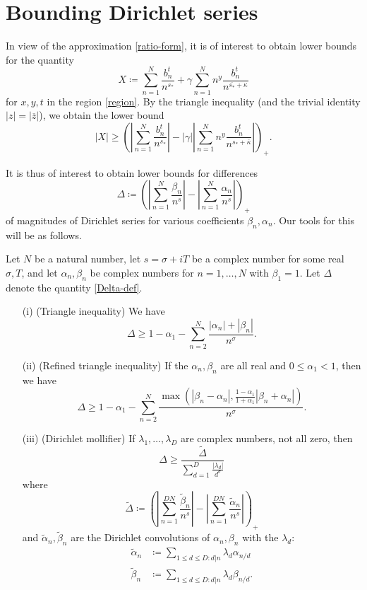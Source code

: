 \section{Bounding Dirichlet series}

In view of the approximation \eqref{ratio-form}, it is of interest to obtain lower bounds for the quantity
\begin{equation}\label{xco}
X \coloneqq \sum_{n=1}^N \frac{b_n^t}{n^{s_*}} + \gamma \sum_{n=1}^N n^y \frac{b_n^t}{n^{\overline{s_*} + \kappa}}
\end{equation}
for $x,y,t$ in the region \eqref{region}.  By the triangle inequality (and the trivial identity $|z| = |\overline{z}|$), we obtain the lower bound
$$ |X| \geq \left( \left| \sum_{n=1}^N \frac{b_n^t}{n^{s_*}}\right| - |\gamma| \left| \sum_{n=1}^N n^y \frac{b_n^t}{n^{s_* + \overline{\kappa}}} \right|\right)_+.$$

It is thus of interest to obtain lower bounds for differences
\begin{equation}\label{Delta-def}
 \Delta \coloneqq \left( \left| \sum_{n=1}^N \frac{\beta_n}{n^s}\right| - \left| \sum_{n=1}^N \frac{\alpha_n}{n^s}\right| \right)_+
\end{equation}
of magnitudes of Dirichlet series for various coefficients $\beta_n, \alpha_n$.  Our tools for this will be as follows.

\begin{lemma}\label{dirb}  Let $N$ be a natural number, let $s = \sigma+iT$ be a complex number for some real $\sigma,T$, and let $\alpha_n,\beta_n$ be complex numbers for $n=1,\dots,N$ with $\beta_1=1$.  Let $\Delta$ denote the quantity \eqref{Delta-def}.
\begin{itemize}
\item[(i)]  (Triangle inequality) We have
$$ \Delta \geq 1 - \alpha_1 - \sum_{n=2}^N \frac{|\alpha_n| + |\beta_n|}{n^\sigma}.$$
\item[(ii)]  (Refined triangle inequality) If the $\alpha_n,\beta_n$ are all real and $0 \leq \alpha_1 <1$, then we have 
$$ \Delta \geq 1 - \alpha_1 - \sum_{n=2}^N \frac{\max( |\beta_n-\alpha_n|, \frac{1-\alpha_1}{1+\alpha_1} |\beta_n+\alpha_n|)}{n^\sigma}.$$
\item[(iii)]  (Dirichlet mollifier)  If $\lambda_1,\dots,\lambda_D$ are complex numbers, not all zero, then
$$ \Delta \geq \frac{\tilde \Delta}{\sum_{d=1}^D \frac{|\lambda_d|}{d^\sigma}} $$
where
$$ \tilde \Delta \coloneqq \left( \left| \sum_{n=1}^{DN} \frac{\tilde \beta_n}{n^s}\right| - \left| \sum_{n=1}^{DN} \frac{\tilde \alpha_n}{n^s}\right| \right)_+$$
and $\tilde \alpha_n, \tilde \beta_n$ are the Dirichlet convolutions of $\alpha_n,\beta_n$ with the $\lambda_d$:
\begin{align*}
\tilde \alpha_n &\coloneqq \sum_{1 \leq d \leq D: d|n} \lambda_d \alpha_{n/d} \\
\tilde \beta_n &\coloneqq \sum_{1 \leq d \leq D: d|n} \lambda_d \beta_{n/d}.
\end{align*}
\end{itemize}
\end{lemma}

